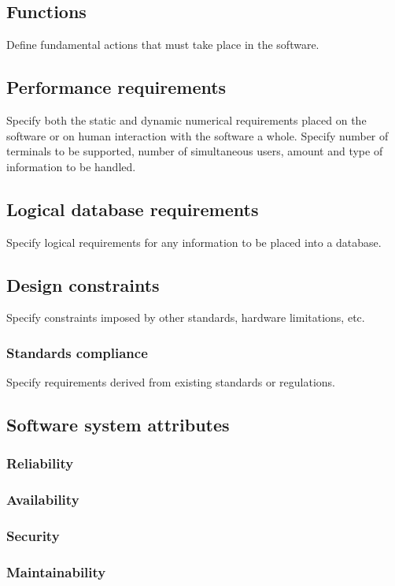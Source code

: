 \documentclass[letterpaper,10pt,draftclsnofoot,onecolumn,titlepage]{IEEEtran}
\begin{document}
	\subsection{Functions}
	Define fundamental actions that must take place in the software.

	\subsection{Performance requirements}
	Specify both the static and dynamic numerical requirements placed on the software or on human interaction with the software a whole.
	Specify number of terminals to be supported, number of simultaneous users, amount and type of information to be handled.

	\subsection{Logical database requirements}
	Specify logical requirements for any information to be placed into a database.

	\subsection{Design constraints}
	Specify constraints imposed by other standards, hardware limitations, etc.

	\subsubsection{Standards compliance}
	Specify requirements derived from existing standards or regulations.

	\subsection{Software system attributes}
	\subsubsection{Reliability}
	\subsubsection{Availability}
	\subsubsection{Security}
	\subsubsection{Maintainability}
\end{document}
